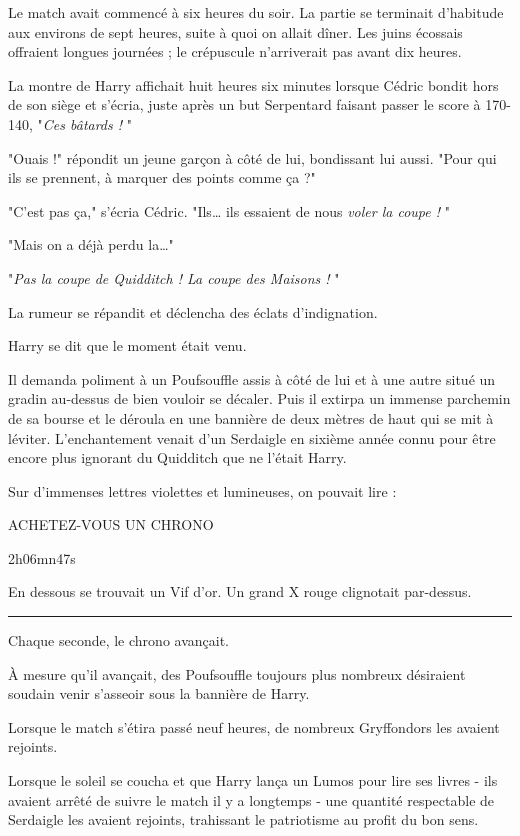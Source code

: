 Le match avait commencé à six heures du soir. La partie se terminait d'habitude aux environs de sept heures, suite à quoi on allait dîner. Les juins écossais offraient longues journées ; le crépuscule n'arriverait pas avant dix heures.

La montre de Harry affichait huit heures six minutes lorsque Cédric bondit hors de son siège et s'écria, juste après un but Serpentard faisant passer le score à 170-140, "\emph{Ces bâtards !} "

"Ouais !" répondit un jeune garçon à côté de lui, bondissant lui aussi. "Pour qui ils se prennent, à marquer des points comme ça ?"

"C'est pas ça," s'écria Cédric. "Ils… ils essaient de nous \emph{voler la coupe !} "

"Mais on a déjà perdu la…"

"\emph{Pas la coupe de Quidditch ! La coupe des Maisons !} "

La rumeur se répandit et déclencha des éclats d'indignation.

Harry se dit que le moment était venu.

Il demanda poliment à un Poufsouffle assis à côté de lui et à une autre situé un gradin au-dessus de bien vouloir se décaler. Puis il extirpa un immense parchemin de sa bourse et le déroula en une bannière de deux mètres de haut qui se mit à léviter. L'enchantement venait d'un Serdaigle en sixième année connu pour être encore plus ignorant du Quidditch que ne l'était Harry.

Sur d'immenses lettres violettes et lumineuses, on pouvait lire :


\begin{center}ACHETEZ-VOUS UN CHRONO\end{center}



\begin{center}2h06mn47s\end{center}


En dessous se trouvait un Vif d'or. Un grand X rouge clignotait par-dessus.
\par\noindent\rule{\textwidth}{0.4pt}
Chaque seconde, le chrono avançait.

À mesure qu'il avançait, des Poufsouffle toujours plus nombreux désiraient soudain venir s'asseoir sous la bannière de Harry.

Lorsque le match s'étira passé neuf heures, de nombreux Gryffondors les avaient rejoints.

Lorsque le soleil se coucha et que Harry lança un Lumos pour lire ses livres - ils avaient arrêté de suivre le match il y a longtemps - une quantité respectable de Serdaigle les avaient rejoints, trahissant le patriotisme au profit du bon sens.

